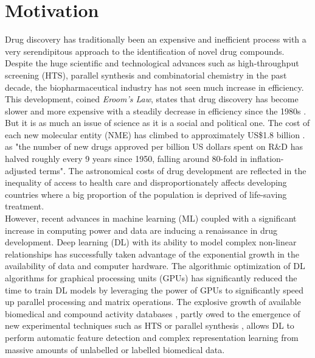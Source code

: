 \documentclass[bsc,frontabs,twoside,singlespacing,parskip,deptreport]{infthesis}     %
\begin{document}
\section{Motivation}
Drug discovery has traditionally been an expensive and inefficient process with a very serendipitous approach to the identification of novel drug compounds.
Despite the huge scientific and technological advances such as high-throughput screening (HTS), parallel synthesis and combinatorial chemistry in the past decade, the biopharmaceutical industry has not seen much increase in efficiency. This development, coined \textit{Eroom's Law}, states that drug discovery has become slower and more expensive with a steadily decrease in efficiency since the 1980s \cite{scannell_diagnosing_2012}. But it is as much an issue of science as it is a social and political one. The cost of each new molecular entity (NME) has climbed to approximately US\$1.8 billion \cite{paul_how_2010}. as "the number of new drugs approved per billion US dollars spent on R\&D has halved roughly every 9 years since 1950, falling around 80-fold in inflation-adjusted terms"\cite{scannell_diagnosing_2012}.
The astronomical costs of drug development are reflected in the inequality of access to health care and disproportionately affects developing countries where a big proportion of the population is deprived of life-saving treatment. \\
However, recent advances in machine learning (ML) coupled with a significant increase in computing power and data are inducing a renaissance in drug development.
Deep learning (DL) \cite{lecun_deep_2015} with its ability to model complex non-linear relationships has successfully taken advantage of the exponential growth in the availability of data and computer hardware. The algorithmic optimization of DL algorithms for graphical processing units (GPUs) has significantly reduced the time to train DL models by leveraging the power of GPUs to significantly speed up parallel processing and matrix operations.
The explosive growth of available biomedical and compound activity databases \cite{papadatos_activity_2015}\cite{kim_pubchem_2016}\cite{gaulton_chembl_2012}, partly owed to the emergence of new experimental techniques such as HTS or parallel synthesis \cite{grada_next-generation_2013}, allows DL to perform automatic feature detection and complex representation learning from massive amounts of unlabelled or labelled biomedical data.\\
\end{document}
